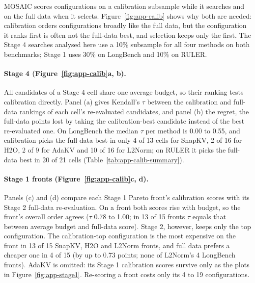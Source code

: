 MOSAIC scores configurations on a calibration subsample while it searches and on the full data when it selects. Figure~\ref{fig:app-calib} shows why both are needed: calibration orders configurations broadly like the full data, but the configuration it ranks first is often not the full-data best, and selection keeps only the first. The Stage 4 searches analysed here use a 10\% subsample for all four methods on both benchmarks; Stage 1 uses 30\% on LongBench and 10\% on RULER.

\paragraph{Stage 4 (Figure~\ref{fig:app-calib}a, b).} All candidates of a Stage 4 cell share one average budget, so their ranking tests calibration directly. Panel (a) gives Kendall's $\tau$ between the calibration and full-data rankings of each cell's re-evaluated candidates, and panel (b) the regret, the full-data points lost by taking the calibration-best candidate instead of the best re-evaluated one. On LongBench the median $\tau$ per method is 0.00 to 0.55, and calibration picks the full-data best in only 4 of 13 cells for SnapKV, 2 of 16 for H2O, 2 of 9 for AdaKV and 10 of 16 for L2Norm; on RULER it picks the full-data best in 20 of 21 cells (Table~\ref{tab:app-calib-summary}).

\paragraph{Stage 1 fronts (Figure~\ref{fig:app-calib}c, d).} Panels (c) and (d) compare each Stage 1 Pareto front's calibration scores with its Stage 2 full-data re-evaluation. On a front both scores rise with budget, so the front's overall order agrees ($\tau$ 0.78 to 1.00; in 13 of 15 fronts $\tau$ equals that between average budget and full-data score). Stage 2, however, keeps only the top configuration. The calibration-top configuration is the most expensive on the front in 13 of 15 SnapKV, H2O and L2Norm fronts, and full data prefers a cheaper one in 4 of 15 (by up to 0.73 points; none of L2Norm's 4 LongBench fronts). AdaKV is omitted: its Stage 1 calibration scores survive only as the plots in Figure~\ref{fig:app-stage1}. Re-scoring a front costs only its 4 to 19 configurations.



\begin{table}[!htbp]
  \centering
  \footnotesize\setlength{\tabcolsep}{2.5pt}
  
  \caption{\textbf{Stage 4 calibration (10\% subset) vs.\ full-data scores, summary.} Cells: (task, budget) pairs. Gap: mean calibration minus full-data score. $\tau$: mean Kendall correlation between the two rankings of each cell's re-evaluated configurations. Picks: cells where the calibration-best candidate is also full-data best. Regret: mean full-data points lost by trusting calibration.}
  \label{tab:app-calib-summary}
\end{table}

